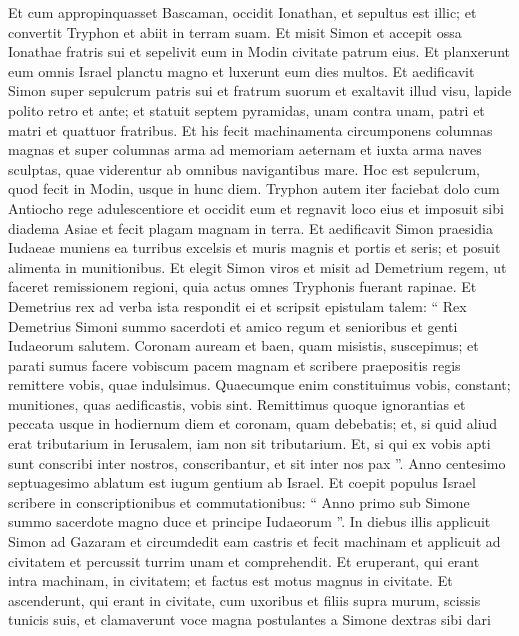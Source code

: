 \begin{biblechapter}
\begin{biblechapter}
\begin{biblechapter}
\begin{biblechapter}
\begin{biblechapter}
\begin{biblechapter}
\begin{biblechapter}
\begin{biblechapter}
\begin{biblechapter}
\begin{biblechapter}
\begin{biblechapter}
\begin{biblechapter}
\begin{biblechapter}
 \verse Et cum appropinquasset Bascaman, occidit Ionathan, et sepultus est illic; 
 \verse et convertit Tryphon et abiit in terram suam. 
\verse Et misit Simon et accepit ossa Ionathae fratris sui et sepelivit eum in Modin civitate patrum eius. 
\verse Et planxerunt eum omnis Israel planctu magno et luxerunt eum dies multos. 
\verse Et aedificavit Simon super sepulcrum patris sui et fratrum suorum et exaltavit illud visu, lapide polito retro et ante; 
\verse et statuit septem pyramidas, unam contra unam, patri et matri et quattuor fratribus. 
\verse Et his fecit machinamenta circumponens columnas magnas et super columnas arma ad memoriam aeternam et iuxta arma naves sculptas, quae viderentur ab omnibus navigantibus mare. 
\verse Hoc est sepulcrum, quod fecit in Modin, usque in hunc diem.
 \verse Tryphon autem iter faciebat dolo cum Antiocho rege adulescentiore et occidit eum 
\verse et regnavit loco eius et imposuit sibi diadema Asiae et fecit plagam magnam in terra. 
\verse Et aedificavit Simon praesidia Iudaeae muniens ea turribus excelsis et muris magnis et portis et seris; et posuit alimenta in munitionibus. 
\verse Et elegit Simon viros et misit ad Demetrium regem, ut faceret remissionem regioni, quia actus omnes Tryphonis fuerant rapinae.
 \verse Et Demetrius rex ad verba ista respondit ei et scripsit epistulam talem: 
 \verse “ Rex Demetrius Simoni summo sacerdoti et amico regum et senioribus et genti Iudaeorum salutem. 
\verse Coronam auream et baen, quam misistis, suscepimus; et parati sumus facere vobiscum pacem magnam et scribere praepositis regis remittere vobis, quae indulsimus. 
\verse Quaecumque enim constituimus vobis, constant; munitiones, quas aedificastis, vobis sint. 
\verse Remittimus quoque ignorantias et peccata usque in hodiernum diem et coronam, quam debebatis; et, si quid aliud erat tributarium in Ierusalem, iam non sit tributarium. 
\verse Et, si qui ex vobis apti sunt conscribi inter nostros, conscribantur, et sit inter nos pax ”.
 \verse Anno centesimo septuagesimo ablatum est iugum gentium ab Israel. 
\verse Et coepit populus Israel scribere in conscriptionibus et commutationibus: “ Anno primo sub Simone summo sacerdote magno duce et principe Iudaeorum ”.
 \verse In diebus illis applicuit Simon ad Gazaram et circumdedit eam castris et fecit machinam et applicuit ad civitatem et percussit turrim unam et comprehendit. 
\verse Et eruperant, qui erant intra machinam, in civitatem; et factus est motus magnus in civitate. 
\verse Et ascenderunt, qui erant in civitate, cum uxoribus et filiis supra murum, scissis tunicis suis, et clamaverunt voce magna postulantes a Simone dextras sibi dari 

\end{biblechapter}
\end{biblechapter}
\end{biblechapter}
\end{biblechapter}
\end{biblechapter}
\end{biblechapter}
\end{biblechapter}
\end{biblechapter}
\end{biblechapter}
\end{biblechapter}
\end{biblechapter}
\end{biblechapter}
\end{biblechapter}
